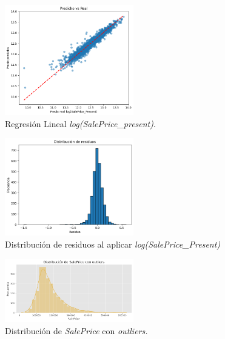 \begin{figure}[ht]
	\begin{center}
	\includegraphics[width=0.5\textwidth]{figures/Regresion Log(Sale Price).png}
	\caption[Regresión Lineal \textit{log(SalePrice\_present)}.]{Regresión Lineal \textit{log(SalePrice\_present)}.}
	\label{fig:grafico logSalePrice con precio}
	\end{center}
\end{figure}

\begin{figure}[ht]
	\begin{center}
	\includegraphics[width=0.5\textwidth]{figures/Residuos Regresión Log Sale Price .png}
	\caption[Distribución de residuos al aplicar \textit{log(SalePrice\_Present)}]{Distribución de residuos al aplicar \textit{log(SalePrice\_Present)}}
	\label{fig:distribucionderesiduoscon log}
	\end{center}
\end{figure}

\begin{figure}[ht]
    \centering
    \includegraphics[width=0.5\textwidth]{figures/Distribución de Sale Price con Outliers.png}
    \caption[Distribución SalePrice]{Distribución de \textit{SalePrice} con \textit{outliers.}}
    \label{fig:residuos con outliers}
\end{figure}

